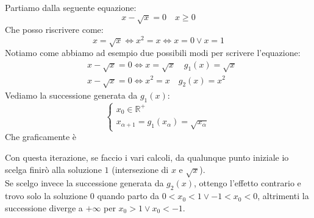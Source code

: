 \begin{example}
	\label{example:fixed_point}
	Partiamo dalla seguente equazione:
	\begin{equation*}
		x - \sqrt{x} = 0 \quad x \geq 0
	\end{equation*}
	Che posso riscrivere come:
	\begin{equation*}
		x = \sqrt{x} \Longleftrightarrow x^2 = x \Longleftrightarrow x = 0 \lor x=1
	\end{equation*}
	Notiamo come abbiamo ad esempio due possibili modi per scrivere l'equazione:
	\begin{align*}
		& x- \sqrt{x} = 0 \Longleftrightarrow x = \sqrt{x} \quad g_1(x)= \sqrt{x} \\
		& x- \sqrt{x} = 0 \Longleftrightarrow x^2 = x \quad g_2(x)=x^2
	\end{align*}
	Vediamo la successione generata da $g_1(x)$:
	\begin{equation*}
		\begin{cases}
			x_0 \in \mathbb{R}^+ \\
			x_{\alpha +1} = g_1(x_\alpha) = \sqrt{x_\alpha}
		\end{cases}
	\end{equation*}
	Che graficamente è
	\begin{center}
	\end{center}
	Con questa iterazione, se faccio i vari calcoli, da qualunque punto iniziale io scelga finirò alla soluzione $1$ (intersezione di $x$ e $\sqrt{x}$).\\
	Se scelgo invece la successione generata da $g_2(x)$, ottengo l'effetto contrario e trovo solo la soluzione $0$ quando parto da $0 < x_0 < 1 \lor -1 < x_0 < 0$, altrimenti la successione diverge a $+\infty$ per $x_0>1 \lor x_0 < -1$.
	\begin{center}
	\end{center}
\end{example}

